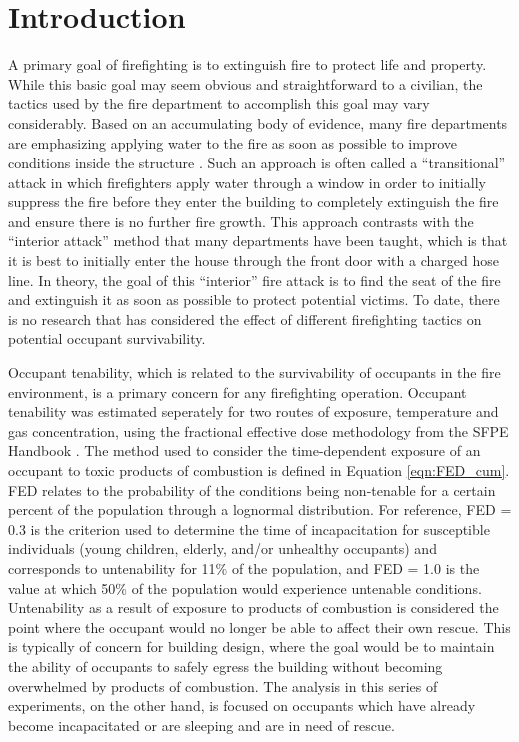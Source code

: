 \documentclass[12pt,oneside]{article}
\begin{document}
\section{Introduction}
\label{sec:intro}

A primary goal of firefighting is to extinguish fire to protect life and property. While this basic goal may seem obvious and straightforward to a civilian, the tactics used by the fire department to accomplish this goal may vary considerably. Based on an accumulating body of evidence, many fire departments are emphasizing applying water to the fire as soon as possible to improve conditions inside the structure \cite{DHS2010}. Such an approach is often called a ``transitional'' attack in which firefighters apply water through a window in order to initially suppress the fire before they enter the building to completely extinguish the fire and ensure there is no further fire growth.  This approach contrasts with the  ``interior attack'' method that many departments have been taught, which is that it is best to initially enter the house through the front door with a charged hose line. In theory, the goal of this ``interior'' fire attack is to find the seat of the fire and extinguish it as soon as possible to protect potential victims. To date, there is no research that has considered the effect of different firefighting tactics on potential occupant survivability.

Occupant tenability, which is related to the survivability of occupants in the fire environment, is a primary concern for any firefighting operation.  Occupant tenability was estimated seperately for two routes of exposure, temperature and gas concentration, using the fractional effective dose methodology from the SFPE Handbook \cite{SFPE:Purser}. The method used to consider the time-dependent exposure of an occupant to toxic products of combustion is defined in Equation \ref{eqn:FED_cum}. FED relates to the probability of the conditions being non-tenable for a certain percent of the population through a lognormal distribution.  For reference, FED = 0.3 is the criterion used to determine the time of incapacitation for susceptible individuals (young children, elderly, and/or unhealthy occupants) and corresponds to untenability for 11\% of the population, and FED = 1.0 is the value at which 50\% of the population would experience untenable conditions. Untenability as a result of exposure to products of combustion is considered the point where the occupant would no longer be able to affect their own rescue. This is typically of concern for building design, where the goal would be to maintain the ability of occupants to safely egress the building without becoming overwhelmed by products of combustion. The analysis in this series of experiments, on the other hand, is focused on occupants which have already become incapacitated or are sleeping and are in need of rescue. 
\end{document}

